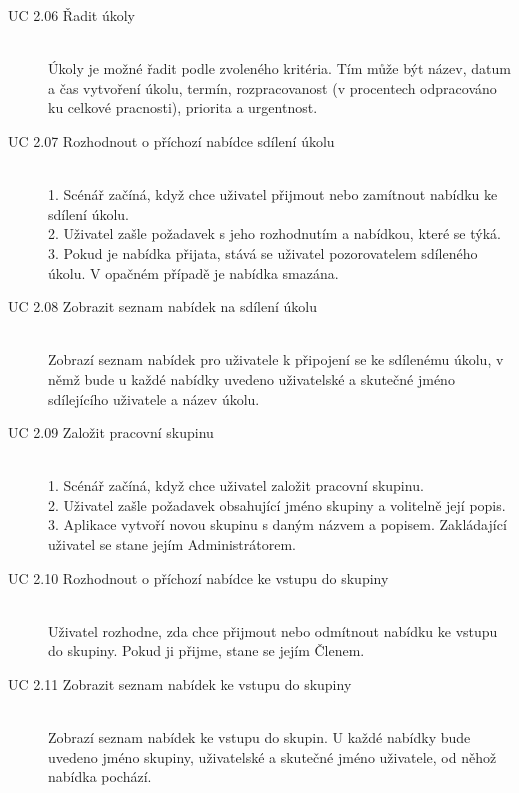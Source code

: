 \documentclass[thesis=B,czech]{FITthesis}[2012/06/26]
\begin{document}
\begin{description}
				\item[UC 2.06 Řadit úkoly] \hfill \\
					Úkoly je možné řadit podle zvoleného kritéria. Tím může být název, datum a čas vytvoření úkolu, termín, rozpracovanost (v procentech odpracováno ku celkové pracnosti), priorita a urgentnost.
				
				\item[UC 2.07 Rozhodnout o příchozí nabídce sdílení úkolu] \hfill \\
					1. Scénář začíná, když chce uživatel přijmout nebo zamítnout nabídku ke sdílení úkolu. \\
					2. Uživatel zašle požadavek s jeho rozhodnutím a nabídkou, které se týká. \\
					3. Pokud je nabídka přijata, stává se uživatel pozorovatelem sdíleného úkolu. V opačném případě je nabídka smazána. \\
				
				\item[UC 2.08 Zobrazit seznam nabídek na sdílení úkolu] \hfill \\
					Zobrazí seznam nabídek pro uživatele k připojení se ke sdílenému úkolu, v němž bude u každé nabídky uvedeno uživatelské a skutečné jméno sdílejícího uživatele a název úkolu.
				
				\item[UC 2.09 Založit pracovní skupinu] \hfill \\
					1. Scénář začíná, když chce uživatel založit pracovní skupinu. \\
					2. Uživatel zašle požadavek obsahující jméno skupiny a volitelně její popis. \\
					3. Aplikace vytvoří novou skupinu s daným názvem a popisem. Zakládající uživatel se stane jejím Administrátorem. \\
					
				\item[UC 2.10 Rozhodnout o příchozí nabídce ke vstupu do skupiny] \hfill \\
					Uživatel rozhodne, zda chce přijmout nebo odmítnout nabídku ke vstupu do skupiny. Pokud ji přijme, stane se jejím Členem.
					
				\item[UC 2.11 Zobrazit seznam nabídek ke vstupu do skupiny] \hfill \\
					Zobrazí seznam nabídek ke vstupu do skupin. U každé nabídky bude uvedeno jméno skupiny, uživatelské a skutečné jméno uživatele, od něhož nabídka pochází.
				

\end{description}
\end{document}
